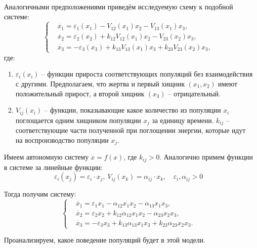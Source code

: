    Аналогичными предположениями приведём исследуемую схему к подобной системе:   
    \[
        \left\{\begin{split}
            & \dot{x_1} = \varepsilon_1(x_1) - V_{12}(x_1)x_2 - V_{13}(x_1)x_3, \\
            & \dot{x_2} = \varepsilon_2(x_2) + k_{12} V_{12}(x_1)x_2 - V_{23}(x_2)x_3, \\
            & \dot{x_3} = -\varepsilon_3(x_3) + k_{13} V_{13}(x_1)x_3 + k_{23} V_{23}(x_2)x_3,
        \end{split}\right.
    \]
    где:
    \begin{enumerate}
        \item \( \varepsilon_i(x_i) \) -- функции прироста соответствующих популяций без взаимодействия с другими. Предполагаем, что жертва и первый хищник \(( x_1, x_2) \) имеют положительный прирост, а второй хищник \(( x_3 )\) -- отрицательный.
        \item \( V_{ij} (x_i) \) -- функции, показывающие какое количество из популяции \(x_i\) поглощается одним хищником популяции \( x_j \) за единицу времени. \(k_{ij}\) -- соответствующие части полученной при поглощении энергии, которые идут на воспроизводство популяции \(x_j\).
    \end{enumerate}
 
    Имеем автономную систему \( \dot{x} = f(x) \), где \( k_{ij} > 0 \). Аналогично примем функции в системе за линейные функции: 
    \[ \varepsilon_i(x_j) = \varepsilon_i \cdot x_j, ~ V_{ij}(x_k) = \alpha_{ij} \cdot x_k, \quad \varepsilon_i, \alpha_{ij} > 0 \]

    Тогда получим систему:
    \[
        \left\{\begin{split}
            & \dot{x_1} = \varepsilon_1 x_1 - \alpha_{12} x_1 x_2 - \alpha_{13} x_1 x_3, \\
            & \dot{x_2} = \varepsilon_2 x_2 + k_{12} \alpha_{12} x_1 x_2 - \alpha_{23} x_2 x_3, \\
            & \dot{x_3} = -\varepsilon_3 x_3 + k_{13} \alpha_{13} x_1 x_3 + k_{23} \alpha_{23} x_2 x_3. 
        \end{split}\right.
    \]

    Проанализируем, какое поведение популяций будет в этой модели.